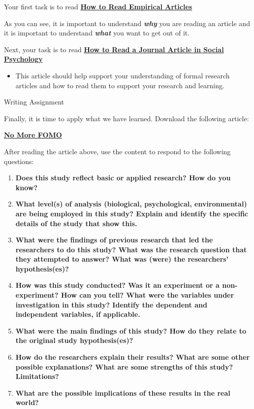 \documentclass[
]{book}
\providecommand{\tightlist}{%
  \setlength{\itemsep}{0pt}\setlength{\parskip}{0pt}}
\begin{document}
\begin{assessment}
Your first task is to read \href{assets/unit_4/Assessment_Empirical_Short.pdf}{\textbf{How to Read Empirical Articles}}

As you can see, it is important to understand \textbf{\emph{why}} you are reading an article and it is important to understand \textbf{\emph{what}} you want to get out of it.

Next, your task is to read \href{assets/unit_4/Assessment_Empirical_Long.pdf}{\textbf{How to Read a Journal Article in Social Psychology}}

\begin{itemize}
\tightlist
\item
  This article should help support your understanding of formal research articles and how to read them to support your research and learning.
\end{itemize}

{Writing Assignment}

Finally, it is time to apply what we have learned. Download the following article:

\href{assets/unit_4/Assessment_FOMO_Article.pdf}{\textbf{No More FOMO}}

After reading the article above, use the content to respond to the following questions:

\begin{enumerate}
\def\labelenumi{\arabic{enumi}.}
\tightlist
\item
  \textbf{Does this study reflect basic or applied research? How do you know?}\\
\item
  \textbf{What level(s) of analysis (biological, psychological, environmental) are being employed in this study? Explain and identify the specific details of the study that show this.}\\
\item
  \textbf{What were the findings of previous research that led the researchers to do this study? What was the research question that they attempted to answer? What was (were) the researchers' hypothesis(es)?}\\
\item
  \textbf{How was this study conducted? Was it an experiment or a non-experiment? How can you tell? What were the variables under investigation in this study? Identify the dependent and independent variables, if applicable.}\\
\item
  \textbf{What were the main findings of this study? How do they relate to the original study hypothesis(es)?}\\
\item
  \textbf{How do the researchers explain their results? What are some other possible explanations? What are some strengths of this study? Limitations?}\\
\item
  \textbf{What are the possible implications of these results in the real world?}
\end{enumerate}


\end{assessment}
\end{document}
